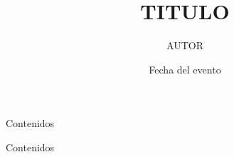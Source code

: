 \documentclass[aspectratio=169]{beamer}
\title{TITULO}
\author{AUTOR}
\date{Fecha del evento}
\begin{document}
{
\begin{frame}[noframenumbering]
  \titlepage
\end{frame}
}

\begin{frame}[t]
  \begin{center}
  Contenidos
  \end{center}
\end{frame}

\begin{frame}[t]
  \begin{center}
  Contenidos
  \end{center}
\end{frame}

\gracias
\end{document}
